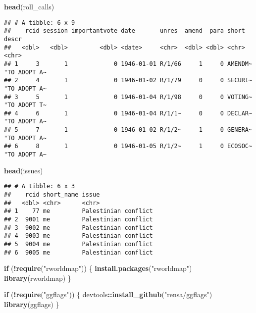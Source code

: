 \documentclass[
]{article}
\newenvironment{Shaded}{\begin{snugshade}}{\end{snugshade}}
\newcommand{\ControlFlowTok}[1]{\textcolor[rgb]{0.13,0.29,0.53}{\textbf{#1}}}
\newcommand{\KeywordTok}[1]{\textcolor[rgb]{0.13,0.29,0.53}{\textbf{#1}}}
\newcommand{\NormalTok}[1]{#1}
\newcommand{\OperatorTok}[1]{\textcolor[rgb]{0.81,0.36,0.00}{\textbf{#1}}}
\newcommand{\StringTok}[1]{\textcolor[rgb]{0.31,0.60,0.02}{#1}}
\begin{document}
\begin{Shaded}
\begin{Highlighting}[]
\KeywordTok{head}\NormalTok{(roll\_calls)}
\end{Highlighting}
\end{Shaded}

\begin{verbatim}
## # A tibble: 6 x 9
##    rcid session importantvote date       unres  amend  para short   descr       
##   <dbl>   <dbl>         <dbl> <date>     <chr>  <dbl> <dbl> <chr>   <chr>       
## 1     3       1             0 1946-01-01 R/1/66     1     0 AMENDM~ "TO ADOPT A~
## 2     4       1             0 1946-01-02 R/1/79     0     0 SECURI~ "TO ADOPT A~
## 3     5       1             0 1946-01-04 R/1/98     0     0 VOTING~ "TO ADOPT T~
## 4     6       1             0 1946-01-04 R/1/1~     0     0 DECLAR~ "TO ADOPT A~
## 5     7       1             0 1946-01-02 R/1/2~     1     0 GENERA~ "TO ADOPT A~
## 6     8       1             0 1946-01-05 R/1/2~     1     0 ECOSOC~ "TO ADOPT A~
\end{verbatim}

\begin{Shaded}
\begin{Highlighting}[]
\KeywordTok{head}\NormalTok{(issues)}
\end{Highlighting}
\end{Shaded}

\begin{verbatim}
## # A tibble: 6 x 3
##    rcid short_name issue               
##   <dbl> <chr>      <chr>               
## 1    77 me         Palestinian conflict
## 2  9001 me         Palestinian conflict
## 3  9002 me         Palestinian conflict
## 4  9003 me         Palestinian conflict
## 5  9004 me         Palestinian conflict
## 6  9005 me         Palestinian conflict
\end{verbatim}

\begin{Shaded}
\begin{Highlighting}[]
\ControlFlowTok{if}\NormalTok{ (}\OperatorTok{!}\KeywordTok{require}\NormalTok{(}\StringTok{"rworldmap"}\NormalTok{)) \{}
  \KeywordTok{install.packages}\NormalTok{(}\StringTok{"rworldmap"}\NormalTok{)}
  \KeywordTok{library}\NormalTok{(rworldmap)}
\NormalTok{\}}

\ControlFlowTok{if}\NormalTok{ (}\OperatorTok{!}\KeywordTok{require}\NormalTok{(}\StringTok{"ggflags"}\NormalTok{)) \{}
\NormalTok{  devtools}\OperatorTok{::}\KeywordTok{install\_github}\NormalTok{(}\StringTok{"rensa/ggflags"}\NormalTok{)}
  \KeywordTok{library}\NormalTok{(ggflags)}
\NormalTok{\}}
\end{Highlighting}
\end{Shaded}
\end{document}
